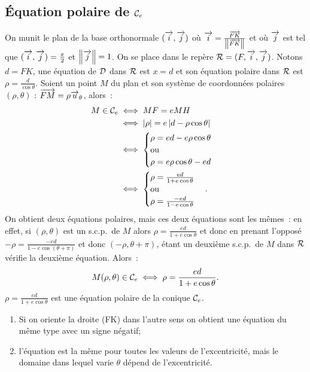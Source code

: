\subsection{Équation polaire de \(\mathcal{C}_{e}\)}
On munit le plan de la base orthonormale \((\overrightarrow{i}, \overrightarrow{j})\) où
\(\overrightarrow{i} = \frac{\overrightarrow{FK}}{\left\lVert\overrightarrow{FK}\right\rVert}\) et où \(\overrightarrow{j}\) est tel que
\((\overrightarrow{i}, \overrightarrow{j}) = \frac{\pi}{2}\) et \(\left\lVert\overrightarrow{j}\right\rVert = 1\). On se place dans le repère
\(\mathcal{R} = (F, \overrightarrow{i}, \overrightarrow{j})\). Notons \(d = FK\), une équation de \(\mathcal{D}\) dans \(\mathcal{R}\) est
\(x = d\) et son équation polaire dans \(\mathcal{R}\) est \(\rho = \frac{d}{\cos
\theta}\). Soient un point \(M\) du plan et son système de coordonnées polaires
\((\rho, \theta)\) : \(\overrightarrow{FM} = \rho\overrightarrow{u}_\theta\), alors~:
\begin{align}
  M \in \mathcal{C}_{e} &\iff MF = e MH \\
                &\iff \left\lvert\rho\right\rvert = e\left\lvert d-\rho \cos\theta\right\rvert\\
                &\iff \begin{cases}\rho = ed-e\rho\cos\theta \\ \text{ou}\\ \rho
                = e\rho\cos\theta-ed \end{cases} \\
                &\iff  \begin{cases}\rho = \frac{ed}{1 + e\cos\theta} \\
                \text{ou}\\ \rho = \frac{-ed}{1-e\cos\theta} \end{cases}.
\end{align}
On obtient deux équations polaires, mais ces deux équations sont les mêmes~: en
effet, si \((\rho, \theta)\) est un s.c.p.\ de \(M\) alors
\(\rho = \frac{ed}{1 + e\cos\theta}\) et donc en prenant l'opposé
\(-\rho = \frac{-ed}{1-e\cos(\theta + \pi)}\) et donc \((-\rho, \theta + \pi)\), étant
un deuxième s.c.p.\ de \(M\) dans \(\mathcal{R}\) vérifie la deuxième équation. Alors~:
\begin{equation}
  M(\rho, \theta) \in \mathcal{C}_{e} \iff \rho = \frac{ed}{1 + e\cos\theta}.
\end{equation}
\(\rho = \frac{ed}{1 + e\cos\theta}\) est une équation polaire de la conique
\(\mathcal{C}_{e}\).
\begin{enumerate}
  \item Si on oriente la droite (FK) dans l'autre sens on obtient une équation
    du même type avec un signe négatif;
  \item l'équation est la même pour toutes les valeurs de l'excentricité, mais
    le domaine dans lequel varie \(\theta\) dépend de l'excentricité.
\end{enumerate}

